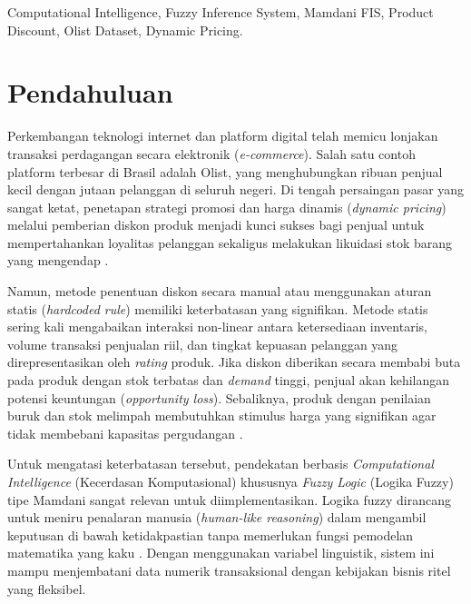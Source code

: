 \documentclass[conference]{IEEEtran}
\begin{document}
\begin{IEEEkeywords}
Computational Intelligence, Fuzzy Inference System, Mamdani FIS, Product Discount, Olist Dataset, Dynamic Pricing.
\end{IEEEkeywords}

\section{Pendahuluan}
Perkembangan teknologi internet dan platform digital telah memicu lonjakan transaksi perdagangan secara elektronik (\textit{e-commerce}). Salah satu contoh platform terbesar di Brasil adalah Olist, yang menghubungkan ribuan penjual kecil dengan jutaan pelanggan di seluruh negeri. Di tengah persaingan pasar yang sangat ketat, penetapan strategi promosi dan harga dinamis (\textit{dynamic pricing}) melalui pemberian diskon produk menjadi kunci sukses bagi penjual untuk mempertahankan loyalitas pelanggan sekaligus melakukan likuidasi stok barang yang mengendap \cite{petrovic2019}.

Namun, metode penentuan diskon secara manual atau menggunakan aturan statis (\textit{hardcoded rule}) memiliki keterbatasan yang signifikan. Metode statis sering kali mengabaikan interaksi non-linear antara ketersediaan inventaris, volume transaksi penjualan riil, dan tingkat kepuasan pelanggan yang direpresentasikan oleh \textit{rating} produk. Jika diskon diberikan secara membabi buta pada produk dengan stok terbatas dan \textit{demand} tinggi, penjual akan kehilangan potensi keuntungan (\textit{opportunity loss}). Sebaliknya, produk dengan penilaian buruk dan stok melimpah membutuhkan stimulus harga yang signifikan agar tidak membebani kapasitas pergudangan \cite{abdelbasset2021}.

Untuk mengatasi keterbatasan tersebut, pendekatan berbasis \textit{Computational Intelligence} (Kecerdasan Komputasional) khususnya \textit{Fuzzy Logic} (Logika Fuzzy) tipe Mamdani sangat relevan untuk diimplementasikan. Logika fuzzy dirancang untuk meniru penalaran manusia (\textit{human-like reasoning}) dalam mengambil keputusan di bawah ketidakpastian tanpa memerlukan fungsi pemodelan matematika yang kaku \cite{liu2022}. Dengan menggunakan variabel linguistik, sistem ini mampu menjembatani data numerik transaksional dengan kebijakan bisnis ritel yang fleksibel.
\end{document}
